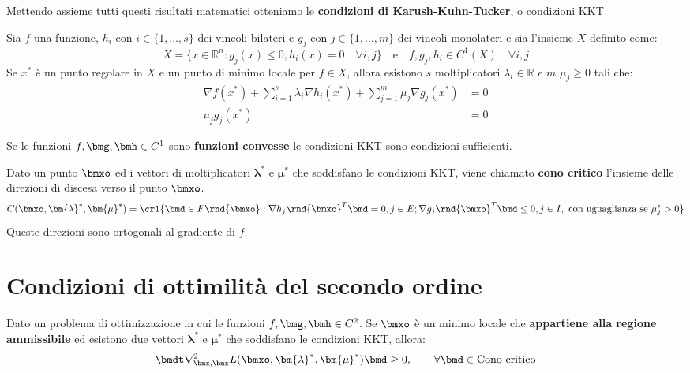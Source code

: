 \documentclass[\main/main.tex]{subfiles}
\begin{document}
Mettendo assieme tutti questi risultati matematici otteniamo le \textbf{condizioni di Karush-Kuhn-Tucker}, o condizioni KKT\@

\begin{theorem}
	Sia \(f \) una funzione, \(h_i \text{ con } i \in \{1, \ldots, s\}\) dei vincoli bilateri e \(g_j \text{ con } j \in \{1, \ldots, m\}\) dei vincoli monolateri e sia l'insieme $X$ definito come:
	\[
		X  = \{x \in \mathbb{R}^n: g_j(x) \leq 0, h_i(x) = 0 \quad \forall i, j \} \quad \text{e} \quad f, g_j, h_i \in C^1(X) \quad \forall i,j
	\]	Se $x^*$ è un punto regolare in $X$ e un punto di minimo locale per \(f \in X\), allora esistono $s$ moltiplicatori $\lambda_i \in \mathbb{R}$ e $m$ $\mu_j \geq 0$ tali che:
	\begin{align*}
		\nabla f(x^*) + \sum_{i=1}^s \lambda_i \nabla h_i(x^*) + \sum_{j=1}^m \mu_j \nabla g_j(x^*) & = 0 \\
		\mu_j g_j(x^*)                                                                              & = 0
	\end{align*}
\end{theorem}

\begin{theorem}
	Se le funzioni \(f, \bmg, \bmh \in C^1\) sono \textbf{funzioni convesse} le condizioni KKT sono condizioni sufficienti.
\end{theorem}

\begin{definition}
	Dato un punto \(\bmxo \) ed i vettori di moltiplicatori \(\bm{\lambda}^*\) e \(\bm{\mu}^*\) che soddisfano le condizioni KKT, viene chiamato \textbf{cono critico} l'insieme delle direzioni di discesa verso il punto \(\bmxo \).
	\[
		C(\bmxo, \bm{\lambda}^*, \bm{\mu}^*) = \crl{\bmd \in F\rnd{\bmxo} : \nabla {h_j\rnd{\bmxo}}^T\bmd = 0, j \in E; {\nabla g_j\rnd{\bmxo}}^T\bmd \leq 0, j \in I, \text{ con uguaglianza se } \mu_j^*>0}
	\]	Queste direzioni sono ortogonali al gradiente di \(f\).
\end{definition}

\section{Condizioni di ottimilità del secondo ordine}

\begin{theorem}
	Dato un problema di ottimizzazione in cui le funzioni \(f, \bmg, \bmh \in C^2\). Se \(\bmxo \) è un minimo locale che \textbf{appartiene alla regione ammissibile} ed esistono due vettori \(\bm{\lambda}^*\) e \(\bm{\mu}^*\) che soddisfano le condizioni KKT, allora:
	\[
		\bmdt \nabla^2_{\bmx, \bmx} L(\bmxo, \bm{\lambda}^*, \bm{\mu}^*)\bmd \geq 0, \qquad \forall \bmd \in \text{Cono critico}
	\]\end{theorem}
\end{document}

